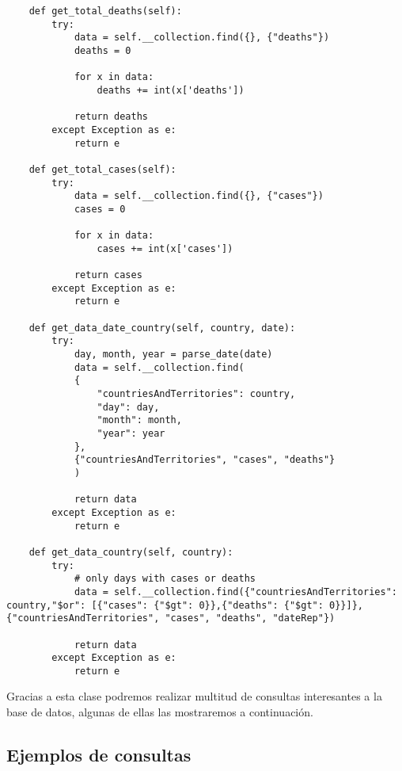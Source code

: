 \documentclass[11pt]{diazessay} %
\begin{document}
\begin{lstlisting}
	def get_total_deaths(self):
		try:
			data = self.__collection.find({}, {"deaths"})
			deaths = 0
			
			for x in data:
				deaths += int(x['deaths'])
			
			return deaths
		except Exception as e:
			return e
	
	def get_total_cases(self):
		try:
			data = self.__collection.find({}, {"cases"})
			cases = 0
			
			for x in data:
				cases += int(x['cases'])
			
			return cases
		except Exception as e:
			return e
	
	def get_data_date_country(self, country, date):
		try:
			day, month, year = parse_date(date)
			data = self.__collection.find(
			{
				"countriesAndTerritories": country,
				"day": day,
				"month": month,
				"year": year
			},
			{"countriesAndTerritories", "cases", "deaths"}
			)
		
			return data
		except Exception as e:
			return e
	
	def get_data_country(self, country):
		try:
			# only days with cases or deaths
			data = self.__collection.find({"countriesAndTerritories": country,"$or": [{"cases": {"$gt": 0}},{"deaths": {"$gt": 0}}]},{"countriesAndTerritories", "cases", "deaths", "dateRep"})
			
			return data
		except Exception as e:
			return e
\end{lstlisting}

Gracias a esta clase podremos realizar multitud de consultas interesantes a la base de datos, algunas de ellas las mostraremos a continuación.

\subsection*{Ejemplos de consultas}
\newpage
\end{document}
